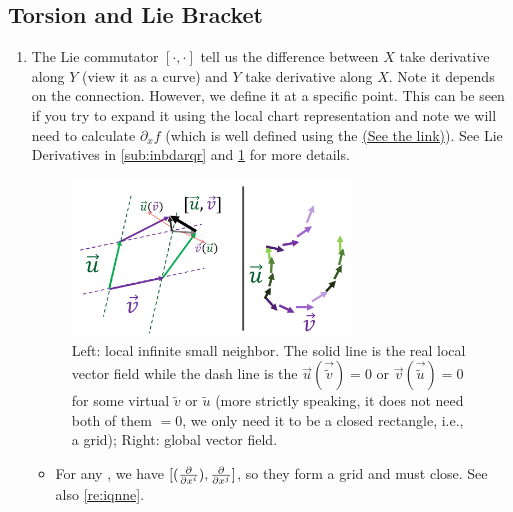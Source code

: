 \documentclass[12pt]{article} %
\begin{document}
\subsection{Torsion and Lie Bracket}
\begin{enumerate}[label=\textbf{\arabic*})]
    \item  {} The Lie commutator $[\cdot,\cdot]$ tell us the difference between $X$ take derivative along $Y$ (view it as a curve) and $Y$ take derivative along $X$. Note it  depends on the connection. However, we  define it at a specific point. This can be seen if you try to expand it using the local chart representation and note we will need to calculate $\partial_x f$ (which is well defined using the  \href{https://math.stackexchange.com/questions/2705586/composition-of-vector-field-regarded-as-sections-of-tangent-bundle}{(See the link)}).
    See Lie Derivatives in \cref{sub:inbdarqr} and \cref{fig:dfadf} for more details.
    \begin{figure}[h]
    \centering
    \includegraphics[width=0.7\textwidth]{Figs/e1.jpg}
    \caption{\small Left: local infinite small neighbor. The solid line is the real local vector field while the dash line is the $\vec{u}(\vec{\tilde{v}})=0$ or  $\vec{v}(\vec{\tilde{u}})=0$ for some virtual $\tilde{v}$ or $\tilde{u}$ (more strictly speaking, it does not need both of them $=0$, we only need it to be a closed rectangle, i.e., a grid); Right: global vector field.}
    \label{fig:dfadf}
\end{figure}
    \begin{itemize}
        \item For any , we have $[(\frac{\partial}{\partial x^i}),\frac{\partial}{\partial x^j}]$, so they form a
grid and must close. See also \cref{re:iqnne}.
 

\end{itemize}
\end{enumerate}
\end{document}
